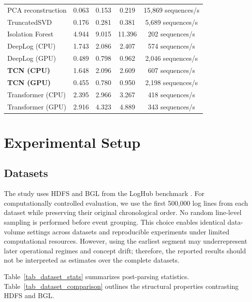 \documentclass[conference]{IEEEtran}
\begin{document}
\begin{table}[!t]
\begin{minipage}[t]{0.48\textwidth}
\begin{tabular}{lcccc}
PCA reconstruction & 0.063 & 0.153 & 0.219 & 15,869 sequences/s \\
TruncatedSVD & 0.176 & 0.281 & 0.381 & 5,689 sequences/s \\
Isolation Forest & 4.944 & 9.015 & 11.396 & 202 sequences/s \\
DeepLog (CPU) & 1.743 & 2.086 & 2.407 & 574 sequences/s \\
DeepLog (GPU) & 0.489 & 0.798 & 0.962 & 2,046 sequences/s \\
\textbf{TCN (CPU)} & 1.648 & 2.096 & 2.609 & 607 sequences/s \\
\textbf{TCN (GPU)} & 0.455 & 0.780 & 0.950 & 2,198 sequences/s \\
Transformer (CPU) & 2.395 & 2.966 & 3.267 & 418 sequences/s \\
Transformer (GPU) & 2.916 & 4.323 & 4.889 & 343 sequences/s \\
\bottomrule
\end{tabular}
\end{minipage}
\end{table}

\section{Experimental Setup}
\subsection{Datasets}
The study uses HDFS and BGL from the LogHub benchmark \cite{b6,b12}. For computationally controlled evaluation, we use the first 500,000 log lines from each dataset while preserving their original chronological order. No random line-level sampling is performed before event grouping. This choice enables identical data-volume settings across datasets and reproducible experiments under limited computational resources. However, using the earliest segment may underrepresent later operational regimes and concept drift; therefore, the reported results should not be interpreted as estimates over the complete datasets.

Table~\ref{tab_dataset_stats} summarizes post-parsing statistics. Table~\ref{tab_dataset_comparison} outlines the structural properties contrasting HDFS and BGL.
\end{document}
